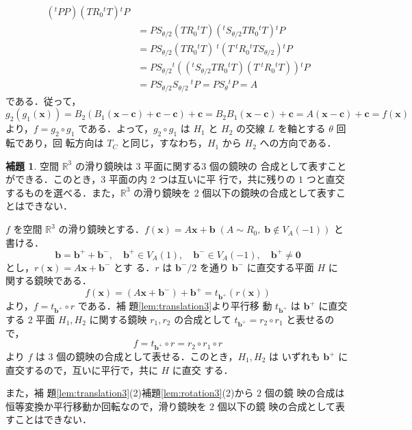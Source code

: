 \documentclass[11pt, uplatex, dvipdfmx, titlepage]{jsarticle}
\makeatletter
\renewenvironment{proof}[1][\proofname]{\par
  \pushQED{\qed}%
  \normalfont \topsep6\p@\@plus6\p@\relax
  \trivlist
  \item[\hskip\labelsep
         \bfseries
    {#1}]\ignorespaces
}{%
  \popQED\endtrivlist\@endpefalse
}
\theoremstyle{definition}
\newtheorem{lemma}{補題}[section]
\renewcommand{\proofname}{\textbf{証明}}
\makeatother
\begin{document}
\begin{proof}
\begin{align*}
              \left({}^{t}P P\right)\left(TR_0 {}^{t}T\right){}^{t}P\\
            & =PS_{\theta/2}\left(TR_0{}^{t}T\right)\left({}^{t}S_{\theta/2}TR_0{}^{t}T\right){}^{t}P\\
            &=P S_{\theta/2}\left(TR_0{}^{t}T\right) \ {}^{t}\left( T \ {}^{t}R_0 {}^{t} T S_{\theta/2}\right) {}^{t}P \\
            &= PS_{\theta/2}{}^{t}\left( \left({}^{t}S_{\theta/2} T R_0 {}^{t} T\right) 
              \left( T \ {}^{t}R_0 {}^{t}T\right)\right) {}^{t}P\\
            &=PS_{\theta/2}  S_{\theta/2}\ {}^{t}P = P S_{\theta} {}^{t}P = A
  \end{align*}
    である．従って，
  \[
    g_2 \left( g_1(\bm{x})\right) = B_2\left( B_1(\bm{x}-\bm{c}) + \bm{c} - \bm{c}\right) + \bm{c}
    = B_2 B_1 (\bm{x}-\bm{c})+\bm{c} = A(\bm{x}-\bm{c}) + \bm{c} = f(\bm{x})
  \]
  より，$f=g_2 \circ g_1$ である．よって，$g_2 \circ
  g_1$ は $H_1$ と $H_2$ の交線 $L$ を軸とする $\theta$ 回転であり，回
  転方向は $T_C$ と同じ，すなわち，$H_1$ から $H_2$ への方向である．
 \end{proof}


 \begin{lemma}\label{lem:glide3}
   空間 $\mathbb{R}^3$ の滑り鏡映は $3$ 平面に関する$3$ 個の鏡映の
   合成として表すことができる．このとき，$3$ 平面の内 $2$ つは互いに平
   行で，共に残りの $1$ つと直交するものを選べる．また，$\mathbb{R}^3$
   の滑り鏡映を $2$ 個以下の鏡映の合成として表すことはできない．
 \end{lemma}

 \begin{proof}
   $f$ を空間 $\mathbb{R}^3$
   の滑り鏡映とする．$f(\bm{x}) = A\bm{x} + \bm{b} \; \left(A \sim
     R_0, \; \bm{b} \notin V_A(-1)\right)$ と書ける．
   \[
     \bm{b} = \bm{b}^{+} + \bm{b}^{-}, \quad \bm{b}^{+} \in V_A(1),
     \quad \bm{b}^{-} \in V_A(-1), \quad \bm{b}^{+} \neq \bm{0}
   \]
   とし，$r(\bm{x}) = A\bm{x} + \bm{b}^{-}$ とす
   る．$r$ は $\bm{b}^{-}/2$ を通り $\bm{b}^{-}$ に直交する平面 $H$ に
   関する鏡映である．
   \[
     f(\bm{x}) = \left(A\bm{x}+\bm{b}^{-}\right) + \bm{b}^{+} =
     t_{\bm{b}^{+}} \left( r(\bm{x})\right)
   \]
   より，$f=t_{\bm{b}^{+}} \circ r$ である．補
   題\ref{lem:translation3}より平行移
   動 $t_{\bm{b}^+}$ は $\bm{b}^{+}$ に直交する $2$ 平面 $H_1, H_2$
   に関する鏡映 $r_1, r_2$ の合成として $t_{\bm{b}^{+}} = r_2 \circ
   r_1$ と表せるので，
   \[
     f = t_{\bm{b}^{+}} \circ r = r_2 \circ r_1 \circ r
   \]
   より $f$ は $3$ 個の鏡映の合成として表せる．このとき，$H_1, H_2$ は
   いずれも $\bm{b}^{+}$ に直交するので，互いに平行で，共に $H$ に直交
   する．
   
   また，補
   題\ref{lem:translation3}(2)補題\ref{lem:rotation3}(2)から $2$ 個の鏡
   映の合成は恒等変換か平行移動か回転なので，滑り鏡映を $2$ 個以下の鏡
   映の合成として表すことはできない．
 \end{proof}
\end{document}
